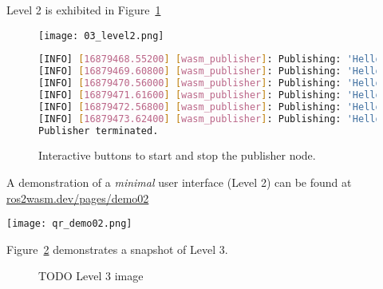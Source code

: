         Level 2 is exhibited in Figure~\ref{fig:ui2}

        \begin{figure}[htbp]
            \centering
            \texttt{[image: 03\_level2.png]}
            \begin{lstlisting}[language=Bash]
[INFO] [16879468.55200] [wasm_publisher]: Publishing: 'Hello there! 13'
[INFO] [16879469.60800] [wasm_publisher]: Publishing: 'Hello there! 14'
[INFO] [16879470.56000] [wasm_publisher]: Publishing: 'Hello there! 15'
[INFO] [16879471.61600] [wasm_publisher]: Publishing: 'Hello there! 16'
[INFO] [16879472.56800] [wasm_publisher]: Publishing: 'Hello there! 17'
[INFO] [16879473.62400] [wasm_publisher]: Publishing: 'Hello there! 18'
Publisher terminated.\end{lstlisting}
            \caption{Interactive buttons to start and stop the publisher node.}\label{fig:ui2}
        \end{figure}

        \begin{tcolorbox}[title=Example 2]
            \begin{minipage}[t]{0.87\linewidth}
                \vspace*{0.5\baselineskip}
                A demonstration of a \textit{minimal} user interface (Level 2) can
                be found at \href{https://ros2wasm.dev/pages/demo02/index.html}{\textsf{ros2wasm.dev/pages/demo02}}
            \end{minipage}\hfill%
            \begin{minipage}[t]{0.1\linewidth}
                \vspace*{0pt}
                \texttt{[image: qr\_demo02.png]}
            \end{minipage}
        \end{tcolorbox}

        Figure~\ref{fig:ui3} demonstrates a snapshot of Level 3.

        \begin{figure}[htbp]
            \centering
            \caption{TODO Level 3 image}\label{fig:ui3}
        \end{figure}

